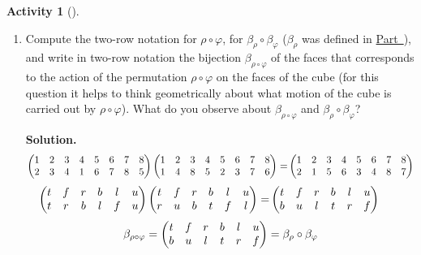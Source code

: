 \documentclass[10pt,]{book}
\theoremstyle{plain}
\theoremstyle{definition}
\newtheorem{activity}[project]{Activity}
\numberwithin{equation}{chapter}
\newcommand{\amp}{&}
\begin{document}
\begin{activity}[]
\begin{enumerate}[label=(\alph*)]
~\par
\item Compute the two-row notation for \(\rho\circ\varphi\), for \(\beta_{\rho}\circ\beta_{\varphi}\) (\(\beta_{\rho}\) was defined in \hyperref[actsonparta]{Part~}), and write in two-row notation the bijection \(\beta_{\rho\circ\varphi}\) of the faces that corresponds to the action of the permutation \(\rho\circ\varphi\) on the faces of the cube (for this question it helps to think geometrically about what motion of the cube is carried out by \(\rho\circ\varphi\)).  What do you observe about \(\beta_{\rho\circ\varphi}\) and \(\beta_{\rho}\circ\beta_{\varphi}\)?%
\par\medskip\noindent%
\textbf{Solution.}\quad %
\begin{align*}
\begin{pmatrix}1\amp 2\amp 3\amp 4\amp 5\amp 6\amp 7\amp 8\cr
2\amp 3\amp 4\amp 1\amp 6\amp 7\amp 8\amp 5
\end{pmatrix} \begin{pmatrix}1\amp 2\amp 3\amp 4\amp 5\amp 6\amp 7\amp 8\cr1\amp 4\amp 8\amp 5\amp 2\amp 3\amp 7\amp 6
\end{pmatrix}  =\amp
\begin{pmatrix}1\amp 2\amp 3\amp 4\amp 5\amp 6\amp 7\amp 8\cr 2\amp 1\amp 5\amp 6\amp 3\amp 4\amp 8\amp 7
\end{pmatrix} \amp \amp
\end{align*}
%
\begin{align*}
\begin{pmatrix}t\amp f\amp r\amp b\amp l\amp u\cr t\amp r\amp b\amp l\amp f\amp u
\end{pmatrix} \begin{pmatrix}t\amp f\amp r\amp b\amp l\amp u\cr r\amp u\amp b\amp t\amp f\amp l
\end{pmatrix}  =\amp
\begin{pmatrix}t\amp f\amp r\amp b\amp l\amp u\cr b\amp u\amp l\amp t\amp r\amp f
\end{pmatrix} \amp \amp
\end{align*}
%
\begin{equation*}
\beta_{\rho\circ\varphi} =\begin{pmatrix}t\amp f\amp r\amp b\amp l\amp u\cr
b\amp u\amp l\amp t\amp r\amp f
\end{pmatrix} =\beta_{\rho}\circ\beta_{\varphi}
\end{equation*}
%

\end{enumerate}
\end{activity}
\end{document}
